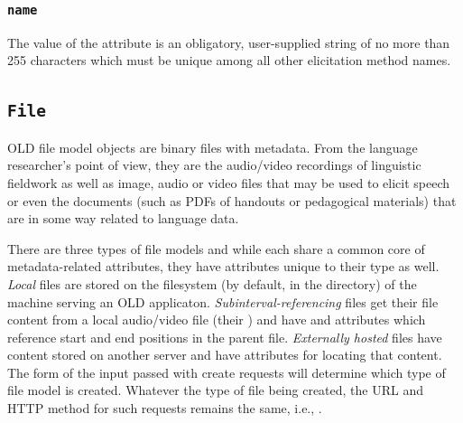 \documentclass[letterpaper,10pt,english]{sphinxmanual}
\begin{document}
\subsubsection{\texttt{name}}
\label{datastructure:name}
The value of the  attribute is an obligatory, user-supplied string of
no more than 255 characters which must be unique among all other elicitation
method names.


\subsection{\texttt{File}}
\label{datastructure:file-data-structure}\label{datastructure:file}
OLD file model objects are binary files with metadata.  From the language
researcher's point of view, they are the audio/video recordings of linguistic
fieldwork as well as image, audio or video files that may be used to elicit
speech or even the documents (such as PDFs of handouts or pedagogical materials)
that are in some way related to language data.

There are three types of file models and while each share a common core of
metadata-related attributes, they have attributes unique to their type as well.
\emph{Local} files are stored on the filesystem (by default, in the 
directory) of the machine serving an OLD applicaton.  \emph{Subinterval-referencing}
files get their file content from a local audio/video file (their
) and have  and  attributes which reference start
and end positions in the parent file.  \emph{Externally hosted} files have content
stored on another server and have  attributes for locating that content.
The form of the input passed with create requests will determine which type of
file model is created. Whatever the type of file being created, the URL and HTTP
method for such requests remains the same, i.e., .
\end{document}
